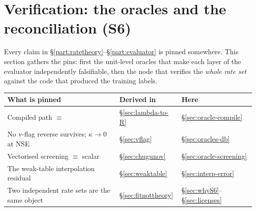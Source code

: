 %

\section{Verification: the oracles and the reconciliation (S6)}
\label{part:verification}

Every claim in \S\ref{part:ratetheory}--\S\ref{part:evaluator} is pinned
somewhere. This section gathers the pins: first the unit-level oracles that make
each layer of the evaluator independently falsifiable, then the node that
verifies the \emph{whole rate set} against the code that produced the training
labels.

\begin{center}
\begin{tabularx}{\textwidth}{@{}L{4.6cm} L{2.0cm} Y@{}}
\toprule
\textbf{What is pinned} & \textbf{Derived in} & \textbf{Here} \\
\midrule
Compiled path $\equiv$  &
  \S\ref{sec:lambda-to-R} & \S\ref{sec:oracle-compile} \\
No v-flag reverse survives; $\kappa \to 0$ at NSE &
  \S\ref{sec:vflag} & \S\ref{sec:oracles-db} \\
Vectorised screening $\equiv$ scalar &
  \S\ref{sec:chugunov} & \S\ref{sec:oracle-screening} \\
The weak-table interpolation residual &
  \S\ref{sec:weaktable} & \S\ref{sec:interp-error} \\
Two independent rate sets are the same object &
  \S\ref{sec:fitnottheory} & \S\ref{sec:whyS6}--\S\ref{sec:licenses} \\
\bottomrule
\end{tabularx}
\end{center}

